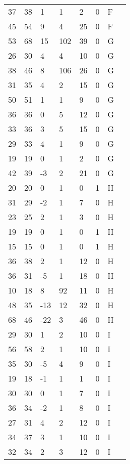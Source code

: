 \begin{longtable}{ p{2cm} p{2cm} p{2cm} p{2cm} p{2cm} p{2cm} p{2cm} p{2cm}}
 37 &  38 &   1 &   1 &   2 &   0 &   F \\ 
 45 &  54 &   9 &   4 &  25 &   0 &   F \\ 
 53 &  68 &  15 & 102 &  39 &   0 &   G \\ 
 26 &  30 &   4 &   4 &  10 &   0 &   G \\ 
 38 &  46 &   8 & 106 &  26 &   0 &   G \\ 
 31 &  35 &   4 &   2 &  15 &   0 &   G \\ 
 50 &  51 &   1 &   1 &   9 &   0 &   G \\ 
 36 &  36 &   0 &   5 &  12 &   0 &   G \\ 
 33 &  36 &   3 &   5 &  15 &   0 &   G \\ 
 29 &  33 &   4 &   1 &   9 &   0 &   G \\ 
 19 &  19 &   0 &   1 &   2 &   0 &   G \\ 
 42 &  39 &  -3 &   2 &  21 &   0 &   G \\ 
 20 &  20 &   0 &   1 &   0 &   1 &   H \\ 
 31 &  29 &  -2 &   1 &   7 &   0 &   H \\ 
 23 &  25 &   2 &   1 &   3 &   0 &   H \\ 
 19 &  19 &   0 &   1 &   0 &   1 &   H \\ 
 15 &  15 &   0 &   1 &   0 &   1 &   H \\ 
 36 &  38 &   2 &   1 &  12 &   0 &   H \\ 
 36 &  31 &  -5 &   1 &  18 &   0 &   H \\ 
 10 &  18 &   8 &  92 &  11 &   0 &   H \\ 
 48 &  35 & -13 &  12 &  32 &   0 &   H \\ 
 68 &  46 & -22 &   3 &  46 &   0 &   H \\ 
 29 &  30 &   1 &   2 &  10 &   0 &   I \\ 
 56 &  58 &   2 &   1 &  10 &   0 &   I \\ 
 35 &  30 &  -5 &   4 &   9 &   0 &   I \\ 
 19 &  18 &  -1 &   1 &   1 &   0 &   I \\ 
 30 &  30 &   0 &   1 &   7 &   0 &   I \\ 
 36 &  34 &  -2 &   1 &   8 &   0 &   I \\ 
 27 &  31 &   4 &   2 &  12 &   0 &   I \\ 
 34 &  37 &   3 &   1 &  10 &   0 &   I \\ 
 32 &  34 &   2 &   3 &  12 &   0 &   I \\ 

\end{longtable}
